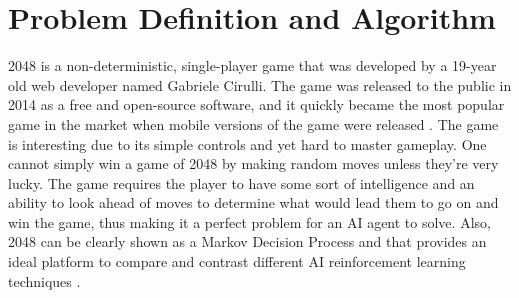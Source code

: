 \documentclass{svproc}
\begin{document}
    \section{Problem Definition and Algorithm} \label{Game Explanation}

    2048 is a non-deterministic, single-player game that was developed by a 19-year old web developer named Gabriele Cirulli. The game was released to the public in 2014 as a free and open-source software, and it quickly became the most popular game in the market when mobile versions of the game were released \cite{wiki_2048}. The game is interesting due to its simple controls and yet hard to master gameplay. One cannot simply win a game of 2048 by making random moves unless they’re very lucky. The game requires the player to have some sort of intelligence and an ability to look ahead of moves to determine what would lead them to go on and win the game, thus making it a perfect problem for an AI agent to solve. Also, 2048 can be clearly shown as a Markov Decision Process and that provides an ideal platform to compare and contrast different AI reinforcement learning techniques \cite{jaskowski, pedagogy}.

\end{document}
